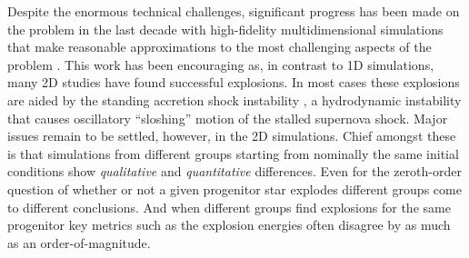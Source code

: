 Despite the enormous technical challenges, significant progress has been made on the problem in the last decade with high-fidelity multidimensional simulations that make reasonable approximations to the most challenging aspects of the problem \citep[e.g.,][]{Ott:2008, Marek:2009, Muller:2012a, Hanke:2013, Bruenn:2013, Bruenn:2014, Tamborra:2014, Hanke:2014, Dolence:2015, Lentz:2015, Melson:2015, Melson:2015a, OConnor:2015a}.
This work has been encouraging as, in contrast to 1D simulations, many 2D studies have found successful explosions.
In most cases these explosions are aided by the standing accretion shock instability \citep[SASI;][]{Blondin:2003, Blondin:2006}, a hydrodynamic instability that causes oscillatory ``sloshing'' motion of the stalled supernova shock.
Major issues remain to be settled, however, in the 2D simulations.
Chief amongst these is that simulations from different groups starting from nominally the same initial conditions show {\it qualitative} and {\it quantitative} differences.
Even for the zeroth-order question of whether or not a given progenitor star explodes different groups come to different conclusions.
And when different groups find explosions for the same progenitor key metrics such as the explosion energies often disagree by as much as an order-of-magnitude.


